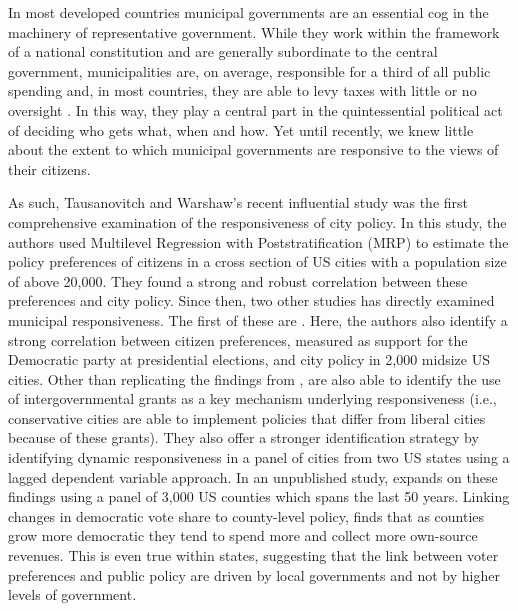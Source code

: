 \documentclass[a4paper,12pt]{article}
\begin{document}
In most developed countries municipal governments are an essential cog in the machinery of representative government. While they work within the framework of a national constitution and are generally subordinate to the central government, municipalities are, on average, responsible for a third of all public spending and, in most countries, they are able to levy taxes with little or no oversight \citep{oecd2016subnational}. In this way, they play a central part in the quintessential political act of deciding who gets what, when and how.  Yet until recently, we knew little about the extent to which municipal governments are responsive to the views of their citizens.


As such, Tausanovitch and Warshaw's \citeyear{tausanovitch2014representation} recent influential study  was the first comprehensive examination of the responsiveness of city policy. In this study, the authors used Multilevel Regression with Poststratification (MRP) to estimate the policy preferences of citizens in a cross section of US cities with a population size of above 20,000. They found a strong and robust correlation between these preferences and city policy. Since then, two other studies has directly examined municipal responsiveness. The first of these are \cite{einstein2016pushing}. Here, the authors also identify a strong correlation between citizen preferences, measured as support for the Democratic party at presidential elections,  and city policy in 2,000 midsize US cities. Other than replicating the findings from \citeauthor{tausanovitch2014representation}, \citeauthor{einstein2016pushing} are also able to identify the use of intergovernmental grants as a key mechanism underlying responsiveness (i.e., conservative cities are able to implement policies that differ from liberal cities because of these grants). They also offer a stronger identification strategy by identifying dynamic responsiveness \citep[cf.][]{stimson1995dynamic} in a panel of cities from two US states using a lagged dependent variable approach. In an unpublished study, \cite{sances2017voters} expands on these findings using a panel of 3,000 US counties which spans the last 50 years. Linking changes in democratic vote share to county-level policy, \citeauthor{sances2017voters} finds that as counties grow more democratic they tend to spend more and collect more own-source revenues. This is even true within states, suggesting that the link between voter preferences and public policy are driven by local governments and not by higher levels of government.
\end{document}
